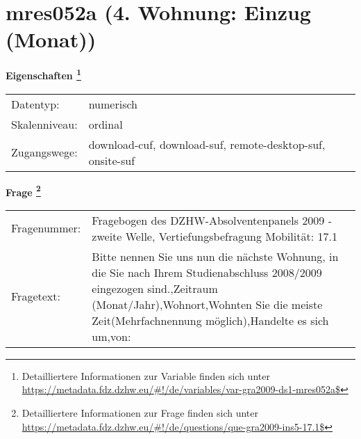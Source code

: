 
    \setcounter{footnote}{0}

    \vspace*{-1.8cm}
	\section{mres052a (4. Wohnung: Einzug (Monat))}
	\label{section:mres052a}



    \vspace*{0.5cm}
    \noindent\textbf{Eigenschaften
	\footnote{Detailliertere Informationen zur Variable finden sich unter
		\url{https://metadata.fdz.dzhw.eu/\#!/de/variables/var-gra2009-ds1-mres052a$}}}\\
	\begin{tabularx}{\hsize}{@{}lX}
	Datentyp: & numerisch \\
	Skalenniveau: & ordinal \\
	Zugangswege: &
	  download-cuf, 
	  download-suf, 
	  remote-desktop-suf, 
	  onsite-suf
 \\
    \end{tabularx}



				\vspace*{0.5cm}
                \noindent\textbf{Frage
	                \footnote{Detailliertere Informationen zur Frage finden sich unter
		              \url{https://metadata.fdz.dzhw.eu/\#!/de/questions/que-gra2009-ins5-17.1$}}}\\
				\begin{tabularx}{\hsize}{@{}lX}
					Fragenummer: &
					  Fragebogen des DZHW-Absolventenpanels 2009 - zweite Welle, Vertiefungsbefragung Mobilität:
					  17.1
 \\
					Fragetext: & Bitte nennen Sie uns nun die nächste Wohnung, in die Sie nach Ihrem Studienabschluss 2008/2009 eingezogen sind.,Zeitraum (Monat/Jahr),Wohnort,Wohnten Sie die meiste Zeit(Mehrfachnennung möglich),Handelte es sich um,von: \\
				\end{tabularx}





